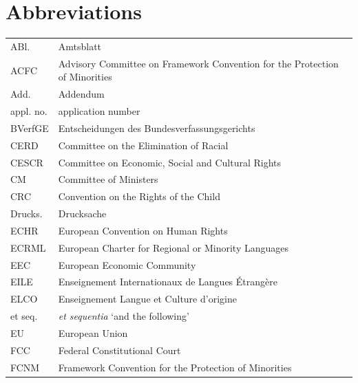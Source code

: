 \documentclass[output=paper,colorlinks,citecolor=brown]{langscibook}
\begin{document}
\section*{Abbreviations}
\small
\begin{tabularx}{.49\textwidth}{lQ}
ABl. & Amtsblatt \\
ACFC & Advisory Committee on Framework Convention for the Protection of  Minorities \\
Add. & Addendum \\
appl. no. & application number \\
BVerfGE & Entscheidungen des Bundesverfassungsgerichts \\
CERD & Committee on the Elimination of Racial  \\
CESCR & Committee on Economic, Social and Cultural Rights \\
CM & Committee of Ministers \\
CRC & Convention on the Rights of the Child \citep{un_crc_1989}\\
Drucks. & Drucksache \\
ECHR & European Convention on Human Rights \citep{coe1952}\\
ECRML & European Charter for Regional or Minority Languages \citep{ecrml2024}\\
EEC & European Economic Community \\
EILE & Enseignement Internationaux de Langues Étrangère \\
ELCO & Enseignement Langue et Culture d’origine \\
et seq. & \textit{et sequentia} `and the following' \\
EU & European Union \\
FCC & Federal Constitutional Court \\
FCNM & Framework Convention for the Protection of  Minorities \citep{fcnm1995}\\
\end{tabularx}%
\end{document}
